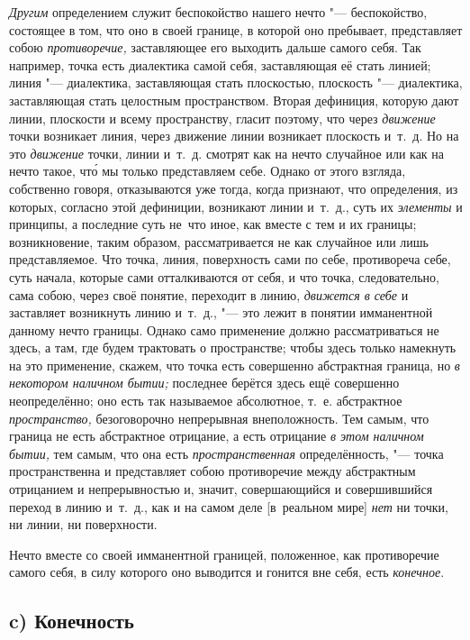 {\em Другим} определением служит беспокойство нашего
нечто "--- беспокойство, состоящее в том, что оно в своей границе, в которой
оно пребывает, представляет собою {\em противоречие,}
заставляющее его выходить дальше самого себя. Так например, точка есть
диалектика самой себя, заставляющая её стать линией; линия "--- диалектика,
заставляющая стать плоскостью, плоскость "--- диалектика, заставляющая стать
целостным пространством. Вторая дефиниция, которую дают линии, плоскости и
всему пространству, гласит поэтому, что через
{\em движение} точки возникает линия, через движение
линии возникает плоскость и~т.~д. Но на это
{\em движение} точки, линии и~т.~д. смотрят как на
нечто случайное или как на нечто такое, чт\'{о} мы только представляем себе.
Однако от этого взгляда, собственно говоря, отказываются уже тогда, когда
признают, что определения, из которых, согласно этой дефиниции, возникают
линии и~т.~д., суть их {\em элементы} и принципы, а
последние суть не~что иное, как вместе с тем и их границы; возникновение,
таким образом, рассматривается не как случайное или лишь представляемое.
Что точка, линия, поверхность сами по себе, противореча себе, суть начала,
которые сами отталкиваются от себя, и что точка, следовательно, сама собою,
через своё понятие, переходит в линию, {\em движется в
себе} и заставляет возникнуть линию и~т.~д., "--- это лежит в понятии
имманентной данному нечто границы. Однако само применение должно
рассматриваться не здесь, а там, где будем трактовать о пространстве; чтобы
здесь только намекнуть на это применение, скажем, что точка есть совершенно
абстрактная граница, но {\em в некотором наличном
бытии;} последнее берётся здесь ещё совершенно неопределённо; оно есть так
называемое абсолютное, т.~е. абстрактное
{\em пространство,} безоговорочно непрерывная
внеположность. Тем самым, что граница не есть абстрактное отрицание, а есть
отрицание {\em в этом наличном бытии,} тем самым, что
она есть {\em пространственная} определённость, "--- точка
пространственна и представляет собою противоречие между абстрактным
отрицанием и непрерывностью и, значит, совершающийся и совершившийся
переход в линию и~т.~д., как и на самом деле [в~реальном мире]
{\em нет} ни точки, ни линии, ни поверхности.

Нечто вместе со своей имманентной границей, положенное, как противоречие
самого себя, в силу которого оно выводится и гонится вне себя, есть
{\em конечное}.

\subsection[c) Конечность]{c) Конечность}

